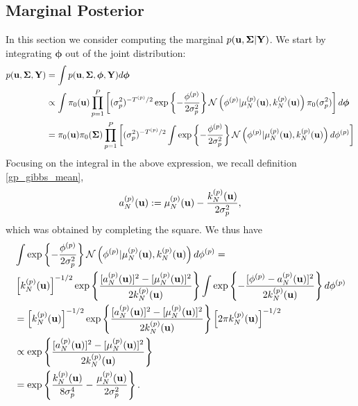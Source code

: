 \documentclass[12pt]{article}
\newcommand{\bphi}{\boldsymbol{\phi}}
\begin{document}
\subsection{Marginal Posterior}
In this section we consider computing the marginal $p(\mathbf{u}, \boldsymbol{\Sigma}|\mathbf{Y})$. We start by integrating $\bphi$ out of the joint distribution: 
\begin{align*}
p(\bpar, \CovObs, \stateMat) 
&= \int p(\bpar, \CovObs, \bphi, \stateMat) d\bphi \\
&\propto \int \priorDens(\bpar) \prod_{\objIdx=1}^{\Nobj} \left[(\sdObs^2_{\objIdx})^{-\indexObj{\Ntime}/2} \exp\left\{-\frac{\indexObj{\phi} }{2\sdObs^2_{\objIdx}} \right\} 
\Gaussian\left(\indexObj{\phi}  | \GPMeanPredOut{\Ndesign}{\objIdx}(\bpar), \GPKerPredOut{\Ndesign}{\objIdx}(\bpar)\right) \priorDens(\sdObs^2_{\objIdx})\right] d\bphi \\
&= \priorDens(\bpar) \priorDens(\CovObs) \prod_{\objIdx=1}^{\Nobj} \left[(\sdObs^2_{\objIdx})^{-\indexObj{\Ntime}/2} \int \exp\left\{-\frac{\indexObj{\phi} }{2\sdObs^2_{\objIdx}} \right\} 
\Gaussian\left(\indexObj{\phi}  | \GPMeanPredOut{\Ndesign}{\objIdx}(\bpar), \GPKerPredOut{\Ndesign}{\objIdx}(\bpar)\right) d\indexObj{\phi}\right]
\end{align*}
Focusing on the integral in the above expression, we recall definition \ref{gp_gibbs_mean},
\[
{a}^{(p)}_{N}(\mathbf{u}) := \mu_{N}^{(p)}(\mathbf{u}) - \frac{k_{N}^{(p)}(\mathbf{u})}{2\sigma^2_{p}},
\]
which was obtained by completing the square. We thus have 
\begin{align*}
&\int \exp\left\{-\frac{{\phi}^{(p)} }{2\sigma^2_{p}} \right\} 
\mathcal{N}\left({\phi}^{(p)}  | \mu_{N}^{(p)}(\mathbf{u}), k_{N}^{(p)}(\mathbf{u})\right) d{\phi}^{(p)} = \\
& \left[k_{N}^{(p)}(\mathbf{u})\right]^{-1/2} \exp\left\{\frac{[{a}^{(p)}_{N}(\mathbf{u})]^2- [\mu_{N}^{(p)}(\mathbf{u})]^2}{2k_{N}^{(p)}(\mathbf{u})} \right\} \int \exp\left\{-\frac{[{\phi}^{(p)} - {a}^{(p)}_{N}(\mathbf{u})]^2}{2k_{N}^{(p)}(\mathbf{u})} \right\} d{\phi}^{(p)} \\
&= \left[k_{N}^{(p)}(\mathbf{u})\right]^{-1/2} \exp\left\{\frac{[{a}^{(p)}_{N}(\mathbf{u})]^2- [\mu_{N}^{(p)}(\mathbf{u})]^2}{2k_{N}^{(p)}(\mathbf{u})} \right\} \left[2\pi k_{N}^{(p)}(\mathbf{u})\right]^{-1/2} \\
&\propto  \exp\left\{\frac{[{a}^{(p)}_{N}(\mathbf{u})]^2- [\mu_{N}^{(p)}(\mathbf{u})]^2}{2k_{N}^{(p)}(\mathbf{u})} \right\} \\
&= \exp\left\{\frac{k_{N}^{(p)}(\mathbf{u})}{8\sigma^4_{p}} - \frac{\mu_{N}^{(p)}(\mathbf{u})}{2\sigma^2_{p}} \right\}.
\end{align*}
\end{document}
